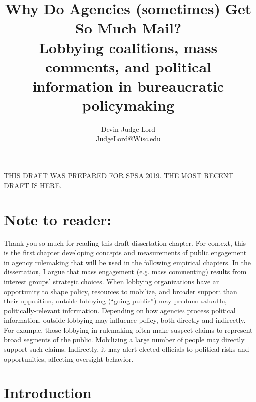 \documentclass{article}
\title{Why Do Agencies (sometimes) Get So Much Mail? \\
Lobbying coalitions, mass comments, and political information in bureaucratic policymaking}
\author{Devin Judge-Lord \\ JudgeLord@Wisc.edu}
\begin{document}
\maketitle

\centering THIS DRAFT WAS PREPARED FOR SPSA 2019. THE MOST RECENT DRAFT IS \href{https://github.com/judgelord/dissertation/raw/master/whyMail.pdf}{HERE}.

\abstract{}


\newpage
\tableofcontents

\newpage
\section*{Note to reader:}
Thank you so much for reading this draft dissertation chapter. For context, this is the first chapter developing concepts and measurements of public engagement in agency rulemaking that will be used in the following empirical chapters. 
In the dissertation, I argue that mass engagement (e.g. mass commenting) results from interest groups' strategic choices. When lobbying organizations have an opportunity to shape policy, resources to mobilize, and broader support than their opposition, outside lobbying (``going public'') may produce valuable, politically-relevant information. Depending on how agencies process political information, outside lobbying may %
influence policy, both directly and indirectly.
For example, those lobbying in rulemaking often make suspect claims to represent broad segments of the public. Mobilizing a large number of people may directly support such claims.
Indirectly, it may alert elected officials to political risks and opportunities, affecting oversight behavior. %



\doublespace
% 

\newpage
\section{Introduction} \label{intro}

\end{document}
